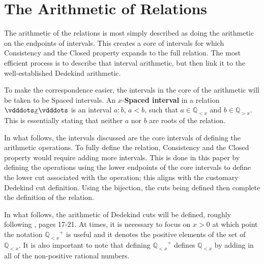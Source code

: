 \documentclass[12pt]{article}
\newcommand{\qcut}[2][x]{\ensuremath{\mathbb{Q}_{#2 #1}}}
\newcommand{\qlt}[1][x]{\qcut[#1]{<}}
\newcommand{\qgt}[1][x]{\qcut[#1]{>}}
\begin{document}
\section{The Arithmetic of Relations}

The arithmetic of the relations is most simply described as doing the arithmetic on the endpoints of intervals. This creates a core of intervals for which Consistency and the Closed property expands to the full relation. The most efficient process is to describe that interval arithmetic, but then link it to the well-established Dedekind arithmetic. 

To make the correspondence easier, the intervals in the core of the arithmetic will be taken to be Spaced intervals. An $x$-\textbf{Spaced interval} in a relation $\xrel$ is an interval $a:b$, $a < b$, such that $a \in \qlt$ and $b \in \qgt$. This is essentially stating that neither $a$ nor $b$ are roots of the relation. 

In what follows, the intervals discussed are the core intervals of defining the arithmetic operations. To fully define the relation, Consistency and the Closed property would require adding more intervals. This is done in this paper by defining the operations using the lower endpoints of the core intervals to define the lower cut associated with the operation; this aligns with the customary Dedekind cut definition. Using the bijection, the cuts being defined then complete the definition of the relation.  

In what follows, the arithmetic of Dedekind cuts will be defined, roughly following \cite{rudin}, pages 17-21.  At times, it is necessary to focus on $x > 0$ at which point the notation $\qlt^+$ is useful and it denotes the positive elements of the set of $\qlt$. It is also important to note that defining $\qlt^+$ defines $\qlt$ by adding in all of the non-positive rational numbers.
\end{document}
